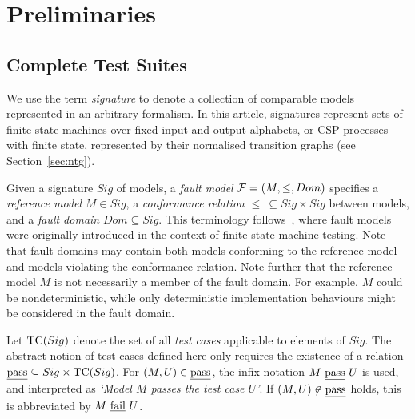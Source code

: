 \section{Preliminaries}
\subsection{Complete Test Suites}
\label{sec:fsmfm}

We use the term \emph{signature} to denote a collection of comparable models represented 
in an arbitrary formalism. In this article, signatures represent sets of 
finite state machines
over fixed input and output alphabets, or CSP processes with finite state, represented 
by their normalised transition graphs (see Section~\ref{sec:ntg}).



Given a signature $Sig$  of models, a  \emph{fault model} ${\cal F} = (M,\le,Dom)$
specifies a \emph{reference model} $M\in Sig$, a \emph{conformance relation} 
$\le\ \subseteq Sig\times Sig$ between models, and a \emph{fault domain}
$Dom\subseteq Sig$. This terminology follows~\cite{gotzhein_fault_1996}, where
fault models were originally introduced in the context of finite state machine testing.
Note that fault domains may contain both models conforming to the reference model and
models violating the conformance relation. Note further that the reference model $M$ 
is not necessarily a member of the fault domain. For example, $M$ could be nondeterministic, while only deterministic implementation behaviours might be  considered in the fault domain.

Let ${\text{TC}}(Sig)$ denote the set of all \emph{test cases} applicable to
elements of $Sig$. The abstract notion of test cases defined here only requires the existence of  
 a  relation $\underline{\text{pass}}\subseteq Sig\times {\text{TC}}(Sig)$. 
For
$(M,U)\in\underline{\text{pass}}$, the infix notation $M\ \underline{\text{pass}}\ U$ is used, and   interpreted as 
{\it `Model $M$ passes the test case $U$'}. 
If $(M,U)\not\in\underline{\text{pass}}$ holds, this is abbreviated by $M\ \underline{\text{fail}}\ U$.




